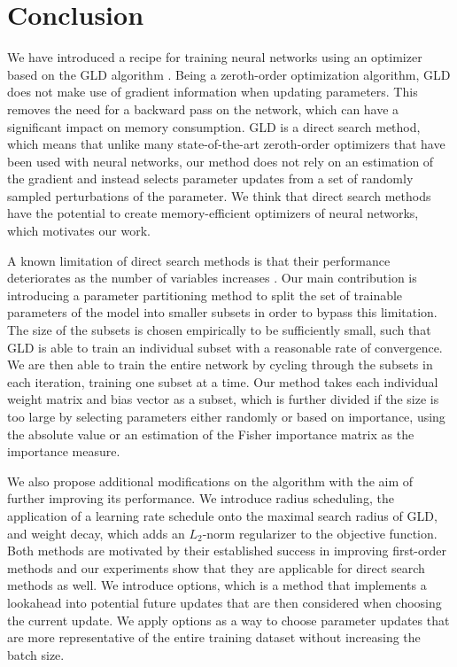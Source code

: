 \chapter{Conclusion}
We have introduced a recipe for training neural networks 
using an optimizer based on the \acf{GLD}
algorithm \parencite{gld}. 
Being a zeroth-order
optimization algorithm, \ac{GLD} does not 
make use of gradient information when updating 
parameters. This removes the 
need for a backward pass on the network, which can have 
a significant impact on memory consumption.
\ac{GLD} is a direct search method, which means that
unlike many state-of-the-art zeroth-order 
optimizers that have been used with neural networks, 
our method does not rely on an estimation of the 
gradient and instead selects parameter updates 
from a set of randomly sampled perturbations
of the parameter. 
We think that direct search methods have the potential
to create memory-efficient optimizers of neural 
networks, which motivates our work.

A known limitation of direct search methods is that 
their performance deteriorates as the number of variables 
increases \parencite{directsearch}. 
Our main contribution is introducing a parameter 
partitioning method to split the set of trainable 
parameters of the model into smaller subsets in order
to bypass this limitation. 
The size of the 
subsets is chosen empirically to be sufficiently small, such 
that \ac{GLD} is able to train an individual subset
with a reasonable rate of convergence.
We are then able to train the entire network by 
cycling through the subsets in each iteration, 
training one subset at a time. Our method takes each
individual weight matrix and bias vector as a subset, 
which is further divided if the size is too large
by selecting parameters either randomly or
based on importance, using the absolute value or
an estimation of the Fisher importance matrix
as the importance measure. 

We also propose additional modifications on the algorithm 
with the aim of  
further improving its performance.
We introduce radius scheduling, the application 
of a learning rate schedule onto the maximal
search radius of \ac{GLD}, and 
weight decay, which adds an $L_2$-norm regularizer 
to the objective function. Both methods are motivated 
by their established 
success in improving first-order methods and our 
experiments show that they are applicable 
for direct search methods as well. We introduce 
options, which is a method that implements 
a lookahead into potential future updates that are then
considered when choosing the current update. 
We apply options as a way to choose parameter updates 
that are more representative of the entire 
training dataset without increasing the batch size. 

